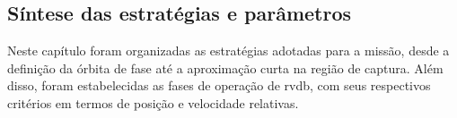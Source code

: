 
\subsection{Síntese das estratégias e parâmetros}
\label{sec:sintese_estrategias_parametros}

Neste capítulo foram organizadas as estratégias adotadas para a missão, desde a definição da órbita de fase até a aproximação curta na região de captura.
Além disso, foram estabelecidas as fases de operação de \gls{rvdb}, com seus respectivos critérios em termos de posição e velocidade relativas.

